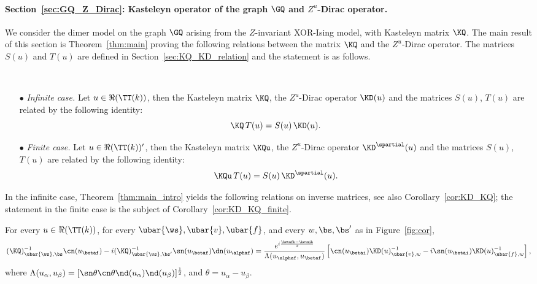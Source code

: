 \documentclass[a4paper,twoside,11pt]{article}
\begin{document}
\paragraph{Section~\ref{sec:GQ_Z_Dirac}: Kasteleyn operator of the graph $\GQ$ and $Z^u$-Dirac operator.}
We consider the dimer model on the graph $\GQ$ arising from the $Z$-invariant XOR-Ising model, with Kasteleyn matrix $\KQ$. The main result
of this section is Theorem~\ref{thm:main} proving the following relations between the matrix $\KQ$ and the $Z^u$-Dirac operator. The matrices
$S(u)$ and $T(u)$ are defined in Section~\ref{sec:KQ_KD_relation} and the statement is as follows.
\begin{thm}\label{thm:main_intro}$\,$
\begin{itemize}
\item[$\bullet$] \emph{Infinite case.} Let $u\in\Re(\TT(k))$, then the Kasteleyn matrix $\KQ$, the $Z^u$-Dirac operator
$\KD(u)$ and the matrices $S(u)$, $T(u)$ are related by the following identity:
\begin{equation*}
\KQ\,T(u) = S(u)\, \KD(u). 
\end{equation*}
\item[$\bullet$] \emph{Finite case.} Let $u\in\Re(\TT(k))'$, then the Kasteleyn matrix $\KQu$, the $Z^u$-Dirac operator $\KD^\spartial(u)$
and the matrices $S(u)$, $T(u)$ are related by the following identity:
\begin{equation*}
\KQu\,T(u) = S(u)\, \KD^\spartial(u).
\end{equation*}
\end{itemize} 
\end{thm}
In the infinite case, Theorem~\ref{thm:main_intro} yields the following relations on inverse matrices, see also Corollary~\ref{cor:KD_KQ}; the 
statement in the finite 
case is the subject of Corollary~\ref{cor:KD_KQ_finite}.
\begin{cor}\label{cor:KD_KQ_intro}
For every $u\in\Re(\TT(k))$, for every $\ubar{\ws},\ubar{v},\ubar{f}$, and every $w,\bs,\bs'$ as in Figure~\ref{fig:cor},
\begin{equation*}
(\KQ)^{-1}_{\ubar{\ws},\bs}\cn(u_{\betaf})-i(\KQ)^{-1}_{\ubar{\ws},\bs'}\sn(u_{\betaf})\dn(u_{\alphaf})
=\frac{e^{i\frac{\betafb-\betaib}{2}}}{\Lambda(u_{\alphaf},u_{\betaf})}
\left[\cn(u_{\betai})\KD(u)^{-1}_{\ubar{v},w}-i\sn({u_{\betai}})\KD(u)^{-1}_{\ubar{f},w}\right],
\end{equation*}
where $\Lambda(u_\alpha,u_\beta)=[\sn\theta\cn\theta\nd(u_{\alpha})\nd(u_{\beta})]^{\frac{1}{2}}$, and 
$\theta=u_\alpha-u_\beta$.
\end{cor}
\end{document}
